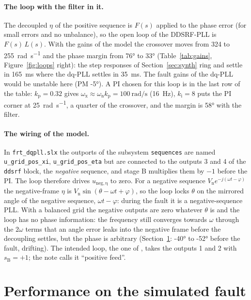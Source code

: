 \documentclass[11pt,a4paper]{scrartcl}
\newcommand{\ped}[1]{_{\mathrm{#1}}}
\newcommand{\code}[1]{\texttt{#1}}
\begin{document}
\begin{onehalfspace}
\paragraph{The loop with the filter in it.} The decoupled $\eta$ of the positive sequence is $F(s)$ applied to the phase error (for small errors and no unbalance), so the open loop of the DDSRF-PLL is $F(s)\, L(s)$. With the gains of the model the crossover moves from \SI{324}{} to \SI{255}{\radian\per\second} and the phase margin from \ang{76} to \ang{33} (Table~\ref{tab:gains}, Figure~\ref{fig:loops} right): the step responses of Section~\ref{sec:synth} ring and settle in \SI{165}{\milli\second} where the dq-PLL settles in \SI{35}{\milli\second}. The fault gains of the dq-PLL would be unstable here (PM \ang{-5}). A PI chosen for this loop is in the last row of the table: $k\ped{p} = 0.32$ gives $\omega\ped{x} \approx \omega\ped{n} k\ped{p} = \SI{100}{\radian\per\second}$ (\SI{16}{\hertz}), $k\ped{i} = 8$ puts the PI corner at \SI{25}{\radian\per\second}, a quarter of the crossover, and the margin is \ang{58} with the filter.

\paragraph{The wiring of the model.} In \code{frt\_dqpll.slx} the outports of the subsystem \code{sequences} are named \code{u\_grid\_pos\_xi}, \code{u\_grid\_pos\_eta} but are connected to the outputs 3 and 4 of the \code{ddsrf} block, the \emph{negative} sequence, and stage B multiplies them by $-1$ before the PI. The loop therefore drives $u\ped{neg,\eta}$ to zero. For a negative sequence $V\ped{n} e^{-j(\omega t - \varphi)}$ the negative-frame $\eta$ is $V\ped{n}\sin(\theta - \omega t + \varphi)$, so the loop locks $\theta$ on the mirrored angle of the negative sequence, $\omega t - \varphi$: during the fault it is a negative-sequence PLL. With a balanced grid the negative outputs are zero whatever $\theta$ is and the loop has no phase information: the frequency still converges towards $\omega$ through the $2\omega$ terms that an angle error leaks into the negative frame before the decoupling settles, but the phase is arbitrary (Section~\ref{sec:logged}: \ang{-40} to \ang{-52} before the fault, drifting). The intended loop, the one of \cite{rodriguez2007}, takes the outputs 1 and 2 with $s\ped{B} = +1$; the note calls it ``positive feed''.

\section{Performance on the simulated fault}
\label{sec:logged}


\end{onehalfspace}
\end{document}
